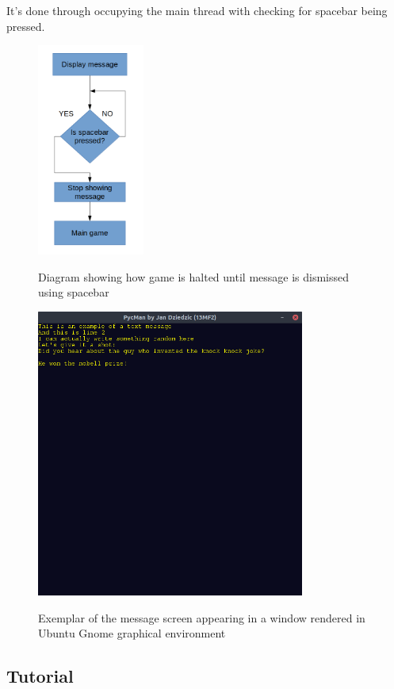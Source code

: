 \documentclass[11pt,a4paper,notitlepage]{report}
\newcommand{\dsubsection}[1]{\FloatBarrier \subsection{#1}}
\newenvironment{img}{
	\begin{center}
		\begin{figure}[H]
			\begin{center}
			
}{
	\end{center}
		\end{figure}
			\end{center}
}
\begin{document}
			It's done through occupying the main thread with checking for spacebar being pressed.
			\begin{img}
				\includegraphics[width=100pt]{images/message-dismiss}\\
				\caption{Diagram showing how game is halted until message is dismissed using spacebar}
			\end{img}
			\begin{img}
				\includegraphics[width=250pt]{images/message-example-joke}\\
				\caption{Exemplar of the message screen appearing in a window rendered in Ubuntu Gnome graphical environment}
			\end{img}
			\dsubsection{Tutorial}
\end{document}
